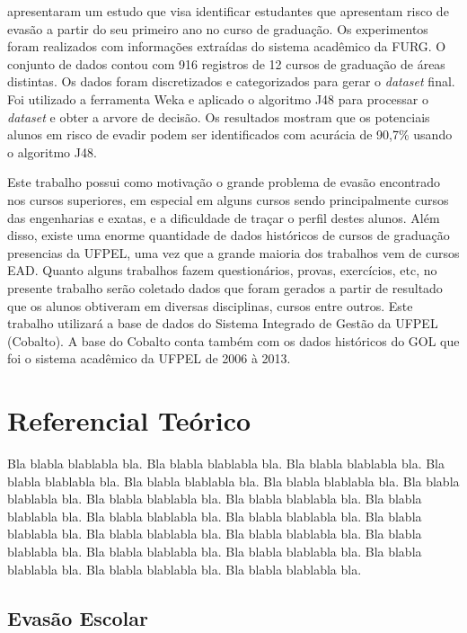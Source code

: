 \documentclass[diss,capa]{texufpel}
\begin{document}

\citet{lanes2018prediccao} apresentaram um estudo que visa identificar estudantes que apresentam risco de evasão a partir do seu primeiro ano no curso de graduação. Os experimentos foram realizados com informações extraídas do sistema acadêmico da FURG. O conjunto de dados contou com 916 registros de 12 cursos de graduação de áreas distintas. Os dados foram discretizados e categorizados para gerar o \textit{dataset} final. Foi utilizado a ferramenta Weka e aplicado o algoritmo J48 para processar o \textit{dataset} e obter a arvore de decisão. Os resultados mostram que os potenciais alunos em risco de evadir podem ser identificados com acurácia de 90,7\% usando o algoritmo J48.


Este trabalho possui como motivação o grande problema de evasão encontrado nos cursos superiores, em especial em alguns cursos sendo principalmente cursos das engenharias e exatas, e a dificuldade de traçar o perfil destes alunos. Além disso, existe uma enorme quantidade de dados históricos de cursos de graduação presencias da UFPEL, uma vez que a grande maioria dos trabalhos vem de cursos EAD. Quanto alguns trabalhos fazem questionários, provas, exercícios, etc, no presente trabalho serão coletado dados que foram gerados a partir de resultado que os alunos obtiveram em diversas disciplinas, cursos entre outros. Este trabalho utilizará a base de dados do Sistema Integrado de Gestão da UFPEL (Cobalto). A base do Cobalto conta também com os dados históricos do GOL que foi o sistema acadêmico da UFPEL de 2006 à 2013.

\chapter{Referencial Teórico}

  Bla blabla blablabla bla.  Bla blabla blablabla bla.  Bla blabla
  blablabla bla.  Bla blabla blablabla bla.  Bla blabla blablabla bla.
  Bla blabla blablabla bla.  Bla blabla blablabla bla.  Bla blabla
  blablabla bla.  Bla blabla blablabla bla.  Bla blabla blablabla bla.
  Bla blabla blablabla bla.  Bla blabla blablabla bla.  Bla blabla
  blablabla bla.  Bla blabla blablabla bla.  Bla blabla blablabla bla.
  Bla blabla blablabla bla.  Bla blabla blablabla bla.  Bla blabla
  blablabla bla.  Bla blabla blablabla bla.  Bla blabla blablabla bla.
  Bla blabla blablabla bla.

\section{Evasão Escolar}
\end{document}
